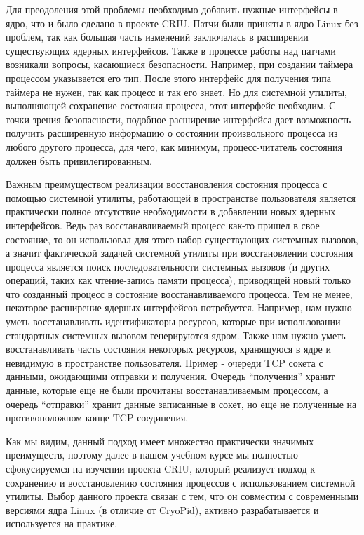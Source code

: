 Для преодоления этой проблемы необходимо добавить нужные интерфейсы в ядро, что и было сделано в проекте CRIU. Патчи были приняты в ядро Linux без проблем, так как большая часть изменений заключалась в расширении существующих ядерных интерфейсов. Также в процессе работы над патчами возникали вопросы, касающиеся безопасности. Например, при создании таймера процессом указывается его тип. После этого интерфейс для получения типа таймера не нужен, так как процесс и так его знает. Но для системной утилиты, выполняющей сохранение состояния процесса, этот интерфейс необходим. С точки зрения безопасности, подобное расширение интерфейса дает возможность получить расширенную информацию о состоянии произвольного процесса из любого другого процесса, для чего, как минимум, процесс-читатель состояния должен быть привилегированным.
 
Важным преимуществом реализации восстановления состояния процесса с помощью системной утилиты, работающей в пространстве пользователя является практически полное отсутствие необходимости в добавлении новых ядерных интерфейсов. Ведь раз восстанавливаемый процесс как-то пришел в свое состояние, то он использовал для этого набор существующих системных вызовов, а значит фактической задачей системной утилиты при восстановлении состояния процесса является поиск последовательности системных вызовов (и других операций, таких как чтение-запись памяти процесса), приводящей новый только что созданный процесс в состояние восстанавливаемого процесса. Тем не менее, некоторое расширение ядерных интерфейсов потребуется. Например, нам нужно уметь восстанавливать идентификаторы ресурсов, которые при использовании стандартных системных вызовом генерируются ядром. Также нам нужно уметь восстанавливать часть состояния некоторых ресурсов, хранящуюся в ядре и невидимую в пространстве пользователя. Пример - очереди TCP сокета с данными, ожидающими отправки и получения. Очередь “получения” хранит данные, которые еще не были прочитаны восстанавливаемым процессом, а очередь “отправки” хранит данные записанные в сокет, но еще не полученные на противоположном конце TCP соединения.
 
Как мы видим, данный подход имеет множество практически значимых преимуществ, поэтому далее в нашем учебном курсе мы полностью сфокусируемся на изучении проекта CRIU, который реализует подход к сохранению и восстановлению состояния процессов с использованием системной утилиты. Выбор данного проекта связан с тем, что он совместим с современными версиями ядра Linux (в отличие от CryoPid), активно разрабатывается и используется на практике.
 
